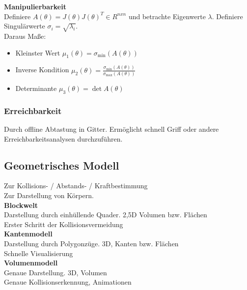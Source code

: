 \textbf{Manipulierbarkeit}\\
Definiere \(A(\theta) = J(\theta){J(\theta)}^T \in R^{nxn}\) und betrachte Eigenwerte \(\lambda\).
Definiere Singulärwerte \(\sigma_i = \sqrt{\lambda_i}\).\\
Daraus Maße:
\begin{itemize}
\item Kleinster Wert \(\mu_1 (\theta) = \sigma_{\min}(A(\theta))\)
\item Inverse Kondition \(\mu_2(\theta) = \frac{\sigma_{\min}(A(\theta))}{\sigma_{\max}(A(\theta))}\)
\item Determinante \(\mu_3(\theta) = \det A(\theta)\)
\end{itemize}

\subsubsection{Erreichbarkeit}
Durch offline Abtastung in Gitter. Ermöglicht schnell Griff oder andere Erreichbarkeitsanalysen durchzuführen.

\subsection{Geometrisches Modell}
Zur Kollisions- / Abstands- / Kraftbestimmung\\
Zur Darstellung von Körpern.\\

\textbf{Blockwelt}\\
Darstellung durch einhüllende Quader. 2,5D Volumen bzw. Flächen\\
Erster Schritt der Kollisionsvermeidung\\

\textbf{Kantenmodell}\\
Darstellung durch Polygonzüge. 3D, Kanten bzw. Flächen\\
Schnelle Visualisierung\\

\textbf{Volumenmodell}\\
Genaue Darstellung. 3D, Volumen\\
Genaue Kollisionserkennung, Animationen